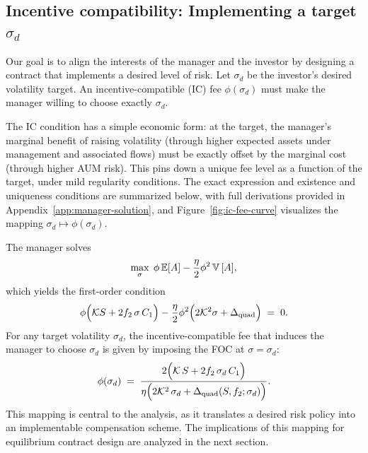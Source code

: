 \subsection{Incentive compatibility: Implementing a target \texorpdfstring{$\sigma_d$}{sigma\_d}}
\label{subsec:IC}

Our goal is to align the interests of the manager and the investor by designing a contract that implements a desired level of risk. Let \(\sigma_d\) be the investor's desired volatility target. An incentive-compatible (IC) fee \(\phi(\sigma_d)\) must make the manager willing to choose exactly \(\sigma_d\).

The IC condition has a simple economic form: at the target, the manager's marginal benefit of raising volatility (through higher expected assets under management and associated flows) must be exactly offset by the marginal cost (through higher AUM risk). This pins down a unique fee level as a function of the target, under mild regularity conditions. The exact expression and existence and uniqueness conditions are summarized below, with full derivations provided in Appendix~\ref{app:manager-solution}, and Figure~\ref{fig:ic-fee-curve} visualizes the mapping $\sigma_d\mapsto \phi(\sigma_d)$.

The manager solves
\[
\max_\sigma \; \phi\,\mathbb{E}[A] - \frac{\eta}{2}\phi^2\,{\mathbb{V}}\,[A],
\]
which yields the first-order condition
\begin{equation}
\phi\Big(\mathcal{K} S + 2 f_2\,\sigma\,C_1\Big) - \frac{\eta}{2}\phi^2\Big(2 \mathcal{K}^2 \sigma + \Delta_{\text{quad}}\Big) \;=\; 0.
\label{eq:manager-FOC}
\end{equation}
For any target volatility $\sigma_d$, the incentive-compatible fee that induces the manager to choose $\sigma_d$ is given by imposing the FOC at $\sigma=\sigma_d$:
\begin{equation}
\label{eq:phi-IC}
\phi(\sigma_d)
\;=\;
\frac{2\Big(\mathcal{K}\,S + 2 f_2 \,\sigma_d\,C_1\Big)}
{\eta\Big(2 \mathcal{K}^2 \,\sigma_d + \Delta_{\text{quad}}(S,f_2;\sigma_d)\Big)}.
\end{equation}
This mapping is central to the analysis, as it translates a desired risk policy into an implementable compensation scheme. The implications of this mapping for equilibrium contract design are analyzed in the next section.

